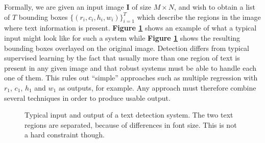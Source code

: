 \documentclass[12pt,a4paper,oneside,english]{UPBThesis}
\newcommand{\hctimes}[2]{{#1}\!\times\!{#2}}
\begin{document}
Formally, we are given an input image $\textbf{I}$ of size $\hctimes{M}{N}$, and wish to obtain a list of $T$ bounding boxes $\{ (r_i,c_i,h_i,w_i) \}_{i=1}^T$ which describe the regions in the image where text information is present. \textbf{Figure \ref{fig:TextDetectBoxes}} shows an example of what a typical input might look like for such a system while \textbf{Figure \ref{fig:TextDetectBoxes}} shows the resulting bounding boxes overlayed on the original image. Detection differs from typical supervised learning by the fact that usually more than one region of text is present in any given image and that robust systems must be able to handle each one of them. This rules out ``simple'' approaches such as multiple regression with $r_1$, $c_1$, $h_1$ and $w_1$ as outputs, for example. Any approach must therefore combine several techniques in order to produce usable output.

\begin{figure}
\centering
{}
\caption{Typical input and output of a text detection system. The two text regions are separated, because of differences in font size. This is not a hard constraint though.}
\label{fig:TextDetectBoxes}
\end{figure}
\end{document}
